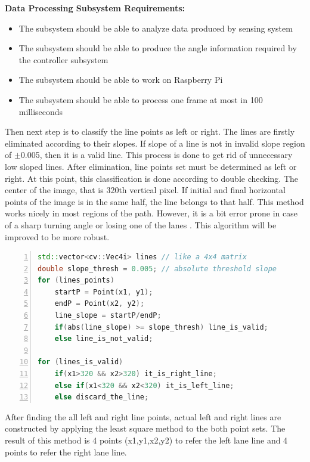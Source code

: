 \documentclass[a4paper,12pt]{article}
\begin{document}
	\textbf{Data Processing Subsystem Requirements:}	
	
	\begin{itemize}
		\item The subsystem should be able to analyze data produced by sensing system
		\item The subsystem should be able to produce the angle information required by the controller subsystem
		\item The subsystem should be able to work on Raspberry Pi
		\item The subsystem should be able to process one frame at most in 100 milliseconds
	\end{itemize}

	Then next step is to classify the line points as left or right. The lines are firstly eliminated according to their slopes. If slope of a line is not in invalid slope region of $\pm$0.005, then it is a valid line. This process is done to get rid of unnecessary low sloped lines. After elimination, line points set must be determined as left or right. At this point, this classification is done according to double checking. The center of the image, that is 320th vertical pixel. If initial and final horizontal points of the image is in the same half, the line belongs to that half. This method works nicely in most regions of the path. However, it is a bit error prone in case of a sharp turning angle or losing one of the lanes . This algorithm will be improved to be more robust.
	\begin{lstlisting}[language=C++,float=t,numbers=left,frame=single,caption=The Algorithm to Classify the Lane Lines as Right or Left, captionpos=b, label=sc:left-right-lines]
std::vector<cv::Vec4i> lines // like a 4x4 matrix
double slope_thresh = 0.005; // absolute threshold slope
for (lines_points)
	startP = Point(x1, y1);
	endP = Point(x2, y2);
	line_slope = startP/endP;
	if(abs(line_slope) >= slope_thresh) line_is_valid;
	else line_is_not_valid;

for (lines_is_valid)	
	if(x1>320 && x2>320) it_is_right_line;
	else if(x1<320 && x2<320) it_is_left_line;
	else discard_the_line;
	\end{lstlisting}
	
	After finding the all left and right line points, actual left and right lines are constructed by applying the least square method to the both point sets. The result of this method is 4 points (x1,y1,x2,y2) to refer the left lane line and 4 points to refer the right lane line.
	
\end{document}
